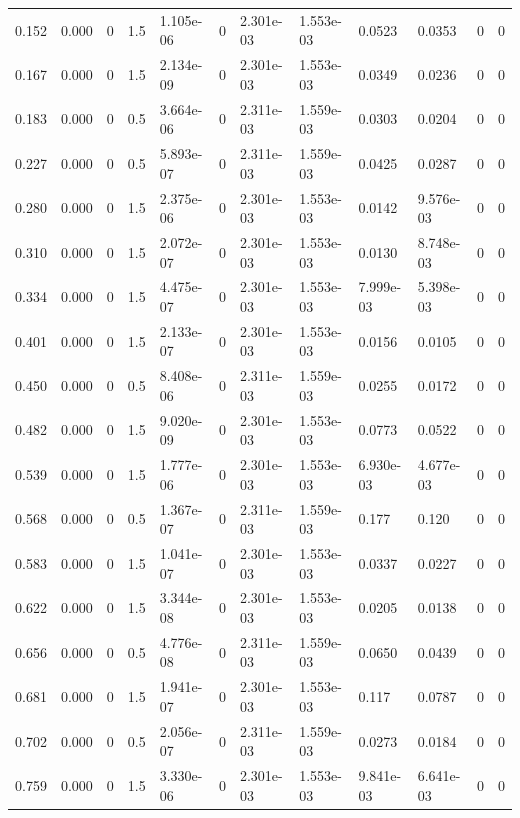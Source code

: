 \documentclass[preview]{standalone}
\begin{document}
{{\begin{tabular}{L{1.2cm}C{1.2cm} C{0.3cm}C{0.5cm} C{1.4cm}C{1.4cm} C{1.4cm}C{1.4cm} C{1.6cm}C{1.6cm} C{1.6cm}C{1.6cm}}
  0.152  &  0.000  & 0     & 1.5 &  1.105e-06  & 0  &  2.301e-03&   1.553e-03& 0.0523 & 0.0353   &  0 & 0  \\ 
  0.167  &  0.000  & 0     & 1.5 &  2.134e-09  & 0  &  2.301e-03&   1.553e-03& 0.0349 & 0.0236   &  0 & 0  \\ 
  0.183  &  0.000  & 0     & 0.5 &  3.664e-06  & 0  &  2.311e-03&   1.559e-03& 0.0303 & 0.0204   &  0 & 0  \\ 
  0.227  &  0.000  & 0     & 0.5 &  5.893e-07  & 0  &  2.311e-03&   1.559e-03& 0.0425 & 0.0287   &  0 & 0  \\ 
  0.280  &  0.000  & 0     & 1.5 &  2.375e-06  & 0  &  2.301e-03&   1.553e-03& 0.0142 & 9.576e-03   &  0 & 0  \\ 
  0.310  &  0.000  & 0     & 1.5 &  2.072e-07  & 0  &  2.301e-03&   1.553e-03& 0.0130 & 8.748e-03   &  0 & 0  \\ 
  0.334  &  0.000  & 0     & 1.5 &  4.475e-07  & 0  &  2.301e-03&   1.553e-03& 7.999e-03 & 5.398e-03   &  0 & 0  \\ 
  0.401  &  0.000  & 0     & 1.5 &  2.133e-07  & 0  &  2.301e-03&   1.553e-03& 0.0156 & 0.0105   &  0 & 0  \\ 
  0.450  &  0.000  & 0     & 0.5 &  8.408e-06  & 0  &  2.311e-03&   1.559e-03& 0.0255 & 0.0172   &  0 & 0  \\ 
  0.482  &  0.000  & 0     & 1.5 &  9.020e-09  & 0  &  2.301e-03&   1.553e-03& 0.0773 & 0.0522   &  0 & 0  \\ 
  0.539  &  0.000  & 0     & 1.5 &  1.777e-06  & 0  &  2.301e-03&   1.553e-03& 6.930e-03 & 4.677e-03   &  0 & 0  \\ 
  0.568  &  0.000  & 0     & 0.5 &  1.367e-07  & 0  &  2.311e-03&   1.559e-03& 0.177 & 0.120   &  0 & 0  \\ 
  0.583  &  0.000  & 0     & 1.5 &  1.041e-07  & 0  &  2.301e-03&   1.553e-03& 0.0337 & 0.0227   &  0 & 0  \\ 
  0.622  &  0.000  & 0     & 1.5 &  3.344e-08  & 0  &  2.301e-03&   1.553e-03& 0.0205 & 0.0138   &  0 & 0  \\ 
  0.656  &  0.000  & 0     & 0.5 &  4.776e-08  & 0  &  2.311e-03&   1.559e-03& 0.0650 & 0.0439   &  0 & 0  \\ 
  0.681  &  0.000  & 0     & 1.5 &  1.941e-07  & 0  &  2.301e-03&   1.553e-03& 0.117 & 0.0787   &  0 & 0  \\ 
  0.702  &  0.000  & 0     & 0.5 &  2.056e-07  & 0  &  2.311e-03&   1.559e-03& 0.0273 & 0.0184   &  0 & 0  \\ 
  0.759  &  0.000  & 0     & 1.5 &  3.330e-06  & 0  &  2.301e-03&   1.553e-03& 9.841e-03 & 6.641e-03   &  0 & 0  \\ 

\end{tabular}}}
\end{document}
